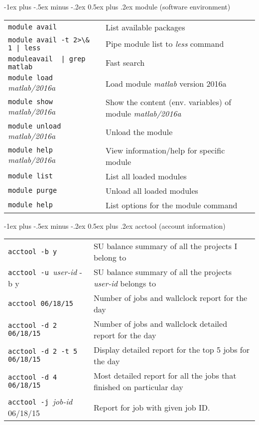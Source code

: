 \documentclass[10pt,landscape]{article}
\makeatletter
\renewcommand{\section}{\@startsection{section}{1}{0mm}%
                                {-1ex plus -.5ex minus -.2ex}%
                                {0.5ex plus .2ex}%
                                {\normalfont\large\bfseries}}
\makeatother
\begin{document}
\begin{multicols*}{2}
\section{module (software environment)}
\begin{tabular}{@{}ll@{}}
\verb!module avail!   & List available packages \\
\verb!module avail -t 2>\& 1 | less!   & Pipe module list to \textit{less} command\\
\verb!moduleavail  | grep matlab!   & Fast search \\
\verb!module load !\textit{matlab/2016a}    & Load module \textit{matlab} version 2016a \\
\verb!module show !\textit{matlab/2016a}    & Show the content (env. variables) of module \textit{matlab/2016a} \\
\verb!module unload !\textit{matlab/2016a}    & Unload the module\\ 
\verb!module help !\textit{matlab/2016a}    & View information/help for specific module\\ 
\verb!module list !    & List all loaded modules\\
\verb!module purge !    & Unload all loaded modules\\
\verb!module help !    & List options for the module command\\
\end{tabular}

\vspace{15pt}

\section{acctool (account information) }
\begin{tabular}{@{}ll@{}}
\verb!acctool -b y!   & SU balance summary of all the projects I belong to \\
\verb!acctool -u !\textit{user-id} -b y   & SU balance summary of all the projects \textit{user-id} belongs to \\
\verb!acctool 06/18/15!   & Number of jobs and wallclock report for the day \\
\verb!acctool -d 2 06/18/15!   & Number of jobs and wallclock detailed report for the day \\
\verb!acctool -d 2 -t 5 06/18/15!   & Display detailed report for the top 5 jobs for the day \\
\verb!acctool -d 4 06/18/15!   & Most detailed report for all the jobs that finished on particular day \\
\verb!acctool -j !\textit{job-id} 06/18/15  & Report for job with given job ID. \\
\end{tabular}


\end{multicols*}
\end{document}
